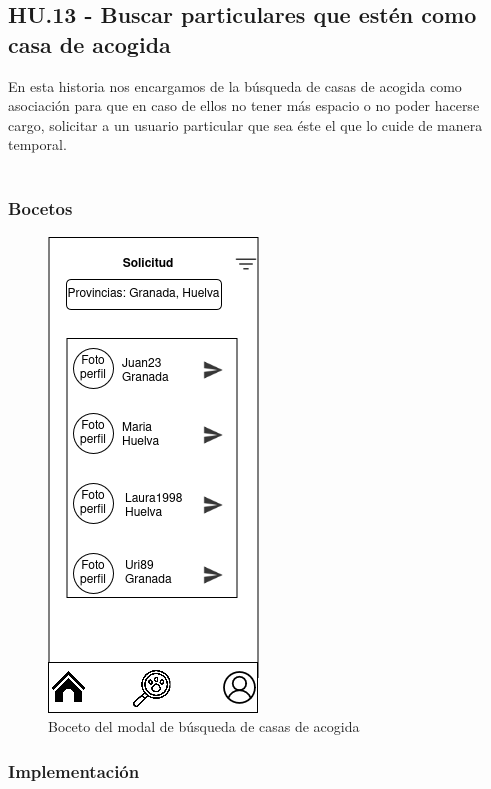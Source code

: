 \subsection{HU.13 - Buscar particulares que estén como casa de acogida}

En esta historia nos encargamos de la búsqueda de casas de acogida como asociación para que en caso de ellos no tener más espacio o no poder hacerse cargo, solicitar a un usuario particular que sea éste el que lo cuide de manera temporal. \\ \\

\subsubsection{Bocetos}
\begin{figure}[H]
	\centering
	\includegraphics[width=0.31\linewidth]{sprint 3//hu13/boceto.png}
	\caption{Boceto del modal de búsqueda de casas de acogida }
\end{figure}

\subsubsection{Implementación}

